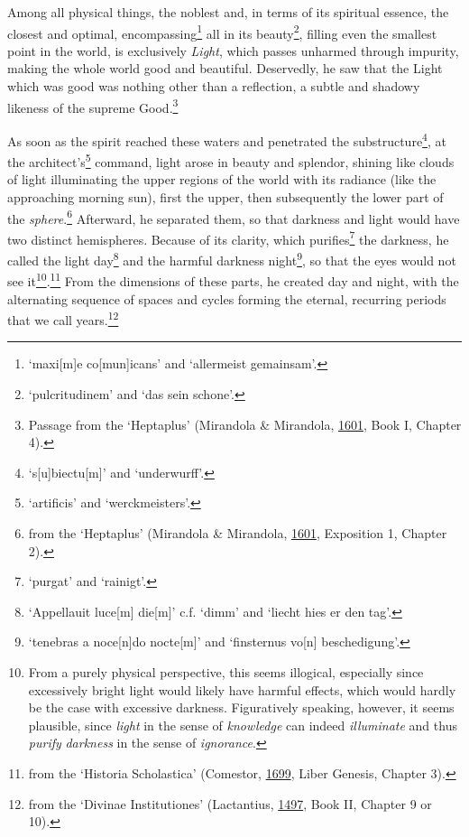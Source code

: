 \documentclass[
]{article}
\begin{document}
Among all physical things, the noblest and, in terms of its spiritual
essence, the closest and optimal, encompassing\footnote{`maxi{[}m{]}e
  co{[}mun{]}icans' and `allermeist gemainsam'.} all in its
beauty\footnote{`pulcritudinem' and `das sein schone'.}, filling even
the smallest point in the world, is exclusively \emph{Light}, which
passes unharmed through impurity, making the whole world good and
beautiful. Deservedly, he saw that the Light which was good was nothing
other than a reflection, a subtle and shadowy likeness of the supreme
Good.\footnote{Passage from the `Heptaplus' (Mirandola \& Mirandola,
  \href{https://doi.org/10.3931/e-rara-61217}{1601}, Book I, Chapter 4).}

As soon as the spirit reached these waters and penetrated the
substructure\footnote{`s{[}u{]}biectu{[}m{]}' and `underwurff'.}, at the
architect's\footnote{`artificis' and `werckmeisters'.} command, light
arose in beauty and splendor, shining like clouds of light illuminating
the upper regions of the world with its radiance (like the approaching
morning sun), first the upper, then subsequently the lower part of the
\emph{sphere}.\footnote{from the `Heptaplus' (Mirandola \& Mirandola,
  \href{https://doi.org/10.3931/e-rara-61217}{1601}, Exposition 1,
  Chapter 2).} Afterward, he separated them, so that darkness and light
would have two distinct hemispheres. Because of its clarity, which
purifies\footnote{`purgat' and `rainigt'.} the darkness, he called the
light day\footnote{`Appellauit luce{[}m{]} die{[}m{]}' c.f. `dimm' and
  `liecht hies er den tag'.} and the harmful darkness night\footnote{`tenebras
  a noce{[}n{]}do nocte{[}m{]}' and `finsternus vo{[}n{]} beschedigung'.},
so that the eyes would not see it\footnote{From a purely physical
  perspective, this seems illogical, especially since excessively bright
  light would likely have harmful effects, which would hardly be the
  case with excessive darkness. Figuratively speaking, however, it seems
  plausible, since \emph{light} in the sense of \emph{knowledge} can
  indeed \emph{illuminate} and thus \emph{purify} \emph{darkness} in the
  sense of \emph{ignorance}.}.\footnote{from the `Historia Scholastica'
  (Comestor,
  \href{https://books.google.com/books?id=fKkLGynZVoYC}{1699}, Liber
  Genesis, Chapter 3).} From the dimensions of these parts, he created
day and night, with the alternating sequence of spaces and cycles
forming the eternal, recurring periods that we call years.\footnote{from
  the `Divinae Institutiones' (Lactantius,
  \href{https://books.google.com/books?id=qGsnghsi3uUC}{1497}, Book II,
  Chapter 9 or 10).}
\end{document}
